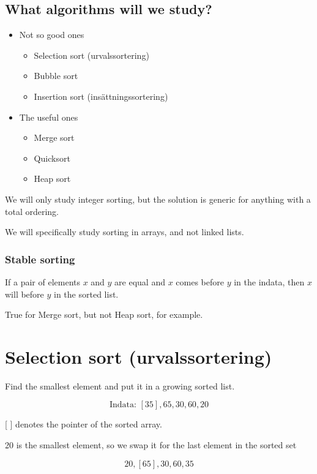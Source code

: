 \documentclass{article}
\begin{document}
\subsection{ What algorithms will we study? }
\begin{itemize}
    \item Not so good ones
    \begin{itemize}
        \item Selection sort (urvalssortering)
        \item Bubble sort
        \item Insertion sort (insättningssortering)
    \end{itemize}
    \item The useful ones
        \begin{itemize}
            \item Merge sort
            \item Quicksort
            \item Heap sort
        \end{itemize}
\end{itemize}

We will only study integer sorting, but the solution is generic for anything with a total ordering.

We will specifically study sorting in arrays, and not linked lists.

\subsubsection{Stable sorting}

If a pair of elements $x$ and $y$ are equal and $x$ comes before $y$ in the indata, then $x$ will before $y$ in the sorted list.

True for Merge sort, but not Heap sort, for example.

\section{Selection sort (urvalssortering)}

Find the smallest element and put it in a growing sorted list.

$$\text{Indata: } [35], 65, 30, 60, 20 $$

[  ] denotes the pointer of the sorted array.

20 is the smallest element, so we swap it for the last element in the sorted set

$$ 20, [65], 30, 60, 35 $$
\end{document}

